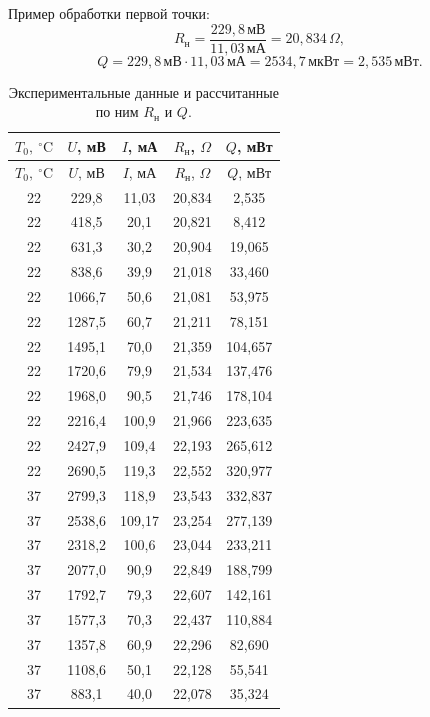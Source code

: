 \documentclass[a4paper,12pt]{article}
\begin{document}
Пример обработки первой точки:
\[
R_{\text{н}}=\frac{229{,}8\,\text{мВ}}{11{,}03\,\text{мА}}=20{,}834\,\Omega,
\]
\[
Q=229{,}8\,\text{мВ}\cdot11{,}03\,\text{мА}=2534{,}7\,\text{мкВт}=2{,}535\,\text{мВт}.
\]

\begin{longtable}{ccccc}
\caption{Экспериментальные данные и рассчитанные по ним $R_{\text{н}}$ и $Q$.}\\
\toprule
$T_0,\ ^\circ\mathrm{C}$ & $U$, мВ & $I$, мА & $R_{\text{н}}$, $\Omega$ & $Q$, мВт \\
\midrule
\endfirsthead
\toprule
$T_0,\ ^\circ\mathrm{C}$ & $U$, мВ & $I$, мА & $R_{\text{н}}$, $\Omega$ & $Q$, мВт \\
\midrule
\endhead
22 & 229{,}8 & 11{,}03 & 20{,}834 & 2{,}535 \\
22 & 418{,}5 & 20{,}1 & 20{,}821 & 8{,}412 \\
22 & 631{,}3 & 30{,}2 & 20{,}904 & 19{,}065 \\
22 & 838{,}6 & 39{,}9 & 21{,}018 & 33{,}460 \\
22 & 1066{,}7 & 50{,}6 & 21{,}081 & 53{,}975 \\
22 & 1287{,}5 & 60{,}7 & 21{,}211 & 78{,}151 \\
22 & 1495{,}1 & 70{,}0 & 21{,}359 & 104{,}657 \\
22 & 1720{,}6 & 79{,}9 & 21{,}534 & 137{,}476 \\
22 & 1968{,}0 & 90{,}5 & 21{,}746 & 178{,}104 \\
22 & 2216{,}4 & 100{,}9 & 21{,}966 & 223{,}635 \\
22 & 2427{,}9 & 109{,}4 & 22{,}193 & 265{,}612 \\
22 & 2690{,}5 & 119{,}3 & 22{,}552 & 320{,}977 \\
37 & 2799{,}3 & 118{,}9 & 23{,}543 & 332{,}837 \\
37 & 2538{,}6 & 109{,}17 & 23{,}254 & 277{,}139 \\
37 & 2318{,}2 & 100{,}6 & 23{,}044 & 233{,}211 \\
37 & 2077{,}0 & 90{,}9 & 22{,}849 & 188{,}799 \\
37 & 1792{,}7 & 79{,}3 & 22{,}607 & 142{,}161 \\
37 & 1577{,}3 & 70{,}3 & 22{,}437 & 110{,}884 \\
37 & 1357{,}8 & 60{,}9 & 22{,}296 & 82{,}690 \\
37 & 1108{,}6 & 50{,}1 & 22{,}128 & 55{,}541 \\
37 & 883{,}1 & 40{,}0 & 22{,}078 & 35{,}324 \\

\end{longtable}
\end{document}
